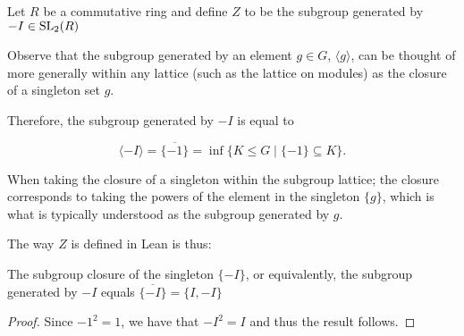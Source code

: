 \begin{definition}
\label{SpecialSubgroups.Z}
\leanok
    Let $R$ be a commutative ring and define $Z$ to be the subgroup generated by $- I \in \operatorname{SL}_2(R)$
\end{definition}

\begin{remark}
    Observe that the subgroup generated by an element $g \in G$, $\langle g \rangle$, 
    can be thought of more generally within any lattice (such as the lattice on modules) as the closure of a singleton set ${g}$. 
    
    Therefore, the subgroup generated by $-I$ is equal to
    
    \[\langle -I \rangle = \overline{\{-1\}} = \inf \{ K \le G \; | \; \{-1\} \subseteq K \}.\]

    When taking the closure of a singleton within the subgroup lattice; 
    the closure corresponds to taking the powers of the element in the singleton $\{g\}$,
    which is what is typically understood as the subgroup generated by $g$.

    The way $Z$ is defined in Lean is thus:

   
\end{remark}

\begin{corollary}
\label{SpecialSubgroups.closure_neg_one_eq}
\leanok
The subgroup closure of the singleton $\{-I\}$, or equivalently, the subgroup generated by $-I$ equals $\overline{\{-I\}} = \{I, -I\}$
\end{corollary}
\begin{proof}
\leanok
Since $-1^2 = 1$, we have that $-I^2 = I$ and thus the result follows.
\end{proof}



